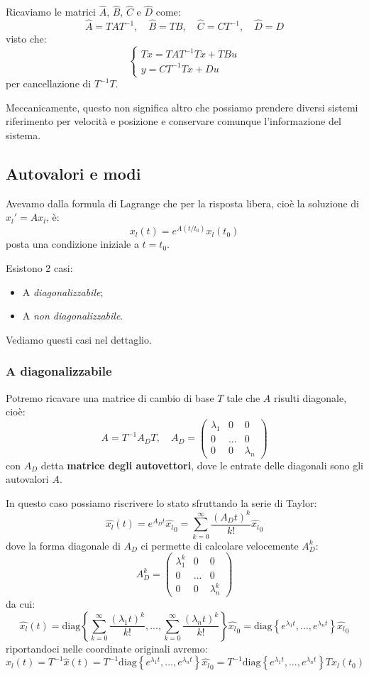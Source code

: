 \documentclass[a4paper,11pt]{article}
\begin{document}
Ricaviamo le matrici $\hat{A}$, $\hat{B}$, $\hat{C}$ e $\hat{D}$ come:
$$
\hat{A} = T A T^{-1}, \quad \hat{B} = TB, \quad \hat{C} = CT^{-1}, \quad \hat{D} = D
$$
visto che:
\[
	\begin{cases}
		T x = T A T^{-1} T x + T B u \\ 
		y = C T^{-1} T x + D u
	\end{cases}
\]
per cancellazione di $T^{-1} T$.

Meccanicamente, questo non significa altro che possiamo prendere diversi sistemi riferimento per velocità e posizione e conservare comunque l'informazione del sistema.

\subsection{Autovalori e modi}
Avevamo dalla formula di Lagrange che per la risposta libera, cioè la soluzione di $x_l' = Ax_l$, è:
$$
	x_l(t) = e^{A(t / t_0)}x_l(t_0)
$$
posta una condizione iniziale a $t = t_0$.

Esistono 2 casi:
\begin{itemize}
	\item A \textit{diagonalizzabile};
	\item A \textit{non diagonalizzabile}.
\end{itemize}

Vediamo questi casi nel dettaglio.

\subsubsection{A diagonalizzabile}
Potremo ricavare una matrice di cambio di base $T$ tale che $A$ risulti diagonale, cioè:
$$
A = T^{-1} A_D T, \quad A_D = \begin{pmatrix}
	\lambda_1 & 0 & 0 \\
	0 & ... & 0 \\
	0 & 0 & \lambda_n
\end{pmatrix}
$$
con $A_D$ detta \textbf{matrice degli autovettori}, dove le entrate delle diagonali sono gli autovalori $A$.

In questo caso possiamo riscrivere lo stato sfruttando la serie di Taylor:
$$
\hat{x_l}(t) = e^{A_Dt} \hat{x_l}_0 = \sum_{k = 0}^\infty \frac{(A_D t)^k}{k!}\hat{x_l}_0
$$
dove la forma diagonale di $A_D$ ci permette di calcolare velocemente $A_D^k$:
$$
A_D^k = \begin{pmatrix}
	\lambda_1^k & 0 & 0 \\
	0 & ... & 0 \\
	0 & 0 & \lambda_n^k
\end{pmatrix}
$$
da cui:
$$
\hat{x_l}(t) = \mathrm{diag} \left\{ \sum_{k = 0}^\infty \frac{(\lambda_1 t)^k}{k!}, ... , \sum_{k = 0}^\infty \frac{(\lambda_n t)^k}{k!} \right\} \hat{x_l}_0
= \mathrm{diag} \left\{ e^{\lambda_1 t}, ..., e^{\lambda_n t} \right\} \hat{x_l}_0
$$
riportandoci nelle coordinate originali avremo:
$$
x_l(t) = T^{-1} \hat{x}(t) = T^{-1} \mathrm{diag} \left\{ e^{\lambda_1 t}, ..., e^{\lambda_n t} \right\} \hat{x_l}_0 = T^{-1} \mathrm{diag} \left\{ e^{\lambda_1 t}, ..., e^{\lambda_n t} \right\} T x_l(t_0)
$$
\end{document}
